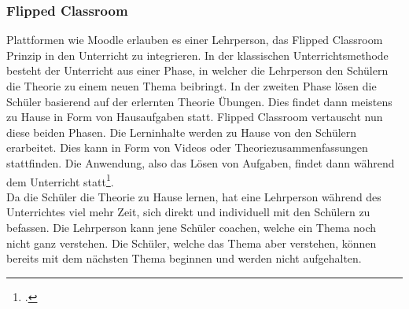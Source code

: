%
%
%

\subsubsection{Flipped Classroom}
Plattformen wie Moodle erlauben es einer Lehrperson, das Flipped Classroom Prinzip in den Unterricht zu integrieren. In der klassischen Unterrichtsmethode besteht der Unterricht aus einer Phase, in welcher die Lehrperson den Schülern die Theorie zu einem neuen Thema beibringt. In der zweiten Phase lösen die Schüler basierend auf der erlernten Theorie Übungen. Dies findet dann meistens zu Hause in Form von Hausaufgaben statt. Flipped Classroom vertauscht nun diese beiden Phasen. Die Lerninhalte werden zu Hause von den Schülern erarbeitet. Dies kann in Form von Videos oder Theoriezusammenfassungen stattfinden. Die Anwendung, also das Lösen von Aufgaben, findet dann während dem Unterricht statt\footcite{flipped_classroom_theorie}. \\

Da die Schüler die Theorie zu Hause lernen, hat eine Lehrperson während des Unterrichtes viel mehr Zeit, sich direkt und individuell mit den Schülern zu befassen. Die Lehrperson kann jene Schüler coachen, welche ein Thema noch nicht ganz verstehen. Die Schüler, welche das Thema aber verstehen, können bereits mit dem nächsten Thema beginnen und werden nicht aufgehalten. \\


